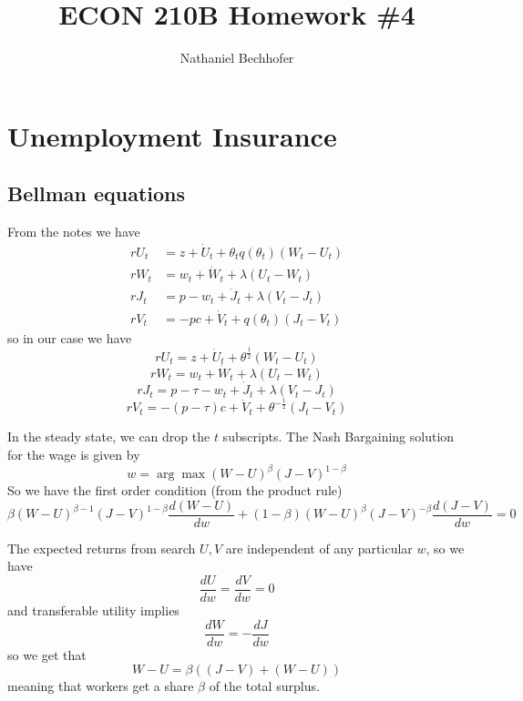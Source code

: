 \documentclass[11pt]{amsart}
\title{ECON 210B Homework \#4}
\author{Nathaniel Bechhofer}
\begin{document}
\maketitle

\section{Unemployment Insurance}

\subsection{Bellman equations}

From the notes we have
\begin{align*}
rU_t &= z + \dot{U}_t + \theta_t q(\theta_t) (W_t - U_t) \\
rW_t &= w_t + \dot{W}_t + \lambda (U_t - W_t) \\
rJ_t &= p - w_t + \dot{J}_t + \lambda (V_t - J_t) \\
rV_t &= -pc + \dot{V}_t + q (\theta_t) (J_t - V_t) 
\end{align*}
so in our case we have
\begin{equation}
rU_t = z + \dot{U}_t + \theta^{\frac{1}{2}} (W_t - U_t)
\end{equation}
\begin{equation}
rW_t = w_t + \dot{W}_t + \lambda (U_t - W_t)
\end{equation}
\begin{equation}
rJ_t = p - \tau - w_t + \dot{J}_t + \lambda (V_t - J_t)
\end{equation}
\begin{equation}
rV_t = -(p - \tau)c + \dot{V}_t + \theta^{-\frac{1}{2}} (J_t - V_t)
\end{equation}

In the steady state, we can drop the $t$ subscripts. The Nash Bargaining solution for the wage is given by
\[
w = \arg \max (W - U)^{\beta} (J - V)^{1-\beta}
\]
So we have the first order condition (from the product rule)
\[
\beta (W - U)^{\beta - 1} (J - V)^{1-\beta} \frac{d (W-U)}{dw} + (1-\beta) (W - U)^{\beta}  (J - V)^{-\beta} \frac{d (J-V)}{dw} = 0
\]

The expected returns from search $U, V$ are independent of any particular $w$, so we have
\[
\frac{dU}{dw} = \frac{dV}{dw} = 0
\]
and transferable utility implies
\[
\frac{dW}{dw} = -\frac{dJ}{dw} 
\]
so we get that
\[
W - U = \beta ((J-V) + (W-U))
\]
meaning that workers get a share $\beta$ of the total surplus.
\end{document}
